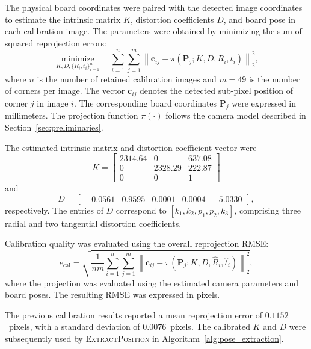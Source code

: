 \documentclass[journal]{IEEEtran}
\begin{document}
The physical board coordinates were paired with
the detected image coordinates to estimate
the intrinsic matrix $K$, distortion coefficients
$D$, and board pose in each calibration image.
The parameters were obtained by minimizing
the sum of squared reprojection errors:
\begin{equation}
\label{eq:camera_calibration_objective}
\underset{K,D,\{R_i,t_i\}_{i=1}^{n}}
{\operatorname{minimize}}
\quad
\sum_{i=1}^{n}\sum_{j=1}^{m}
\left\|
\mathbf c_{ij}
-
\pi(\mathbf P_j;K,D,R_i,t_i)
\right\|_2^2,
\end{equation}
where $n$ is the number of retained calibration
images and $m=49$ is the number of corners
per image.
The vector $\mathbf c_{ij}$ denotes the detected
sub-pixel position of corner $j$ in image $i$.
The corresponding board coordinates $\mathbf P_j$
were expressed in millimeters.
The projection function $\pi(\cdot)$ follows
the camera model described in Section~\ref{sec:preliminaries}.

The estimated intrinsic matrix and distortion
coefficient vector were
\begin{equation}
\label{eq:intrinsic_matrix}
K=
\begin{bmatrix}
2314.64 & 0 & 637.08\\
0 & 2328.29 & 222.87\\
0 & 0 & 1
\end{bmatrix}
\end{equation}
and
\begin{equation}
\label{eq:distortion_coeffs}
D=
\begin{bmatrix}
-0.0561 & 0.9595 & 0.0001 & 0.0004 & -5.0330
\end{bmatrix},
\end{equation}
respectively.
The entries of $D$ correspond to
$[k_1,k_2,p_1,p_2,k_3]$, comprising three radial
and two tangential distortion coefficients.

Calibration quality was evaluated using
the overall reprojection RMSE:
\begin{equation}
\label{eq:camera_calibration_rmse}
e_{\mathrm{cal}}
=
\sqrt{
\frac{1}{nm}
\sum_{i=1}^{n}\sum_{j=1}^{m}
\left\|
\mathbf c_{ij}
-
\pi(\mathbf P_j;K,D,\hat R_i,\hat t_i)
\right\|_2^2
},
\end{equation}
where the projection was evaluated using
the estimated camera parameters and board poses.
The resulting RMSE was expressed in pixels.

The previous calibration results reported a mean
reprojection error of $0.1152$~pixels,
with a standard deviation of $0.0076$~pixels.
The calibrated $K$ and $D$ were subsequently
used by \textsc{ExtractPosition} in
Algorithm~\ref{alg:pose_extraction}.
\end{document}
